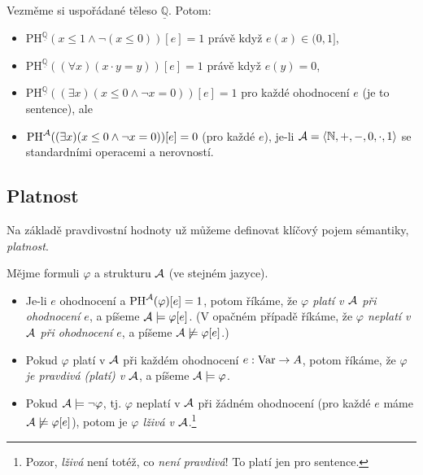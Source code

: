 \begin{example}
Vezměme si uspořádané těleso $\underline{\mathbb Q}$. Potom:
\begin{itemize}
    \item $\mathrm{PH}^{\underline{\mathbb Q}}(x\leq 1 \land \neg (x\leq 0))[e]=1$ právě když $e(x)\in (0,1]$,
    \item $\mathrm{PH}^{\underline{\mathbb Q}}((\forall x)(x\cdot y = y))[e]=1$ právě když $e(y)=0$,
    \item $\mathrm{PH}^{\underline{\mathbb Q}}((\exists x)(x \leq 0 \land \neg x=0))[e]=1$ pro každé ohodnocení $e$ (je to sentence), ale 
    \item $\mathrm{PH}^{\mathcal{A}}((\exists x)(x \leq 0 \land \neg x=0))[e]=0$ (pro každé $e$), je-li $\mathcal{A}=\langle \mathbb N,+,-,0,\cdot,1\rangle$ se standardními operacemi a nerovností.
\end{itemize}    
\end{example}


\subsection{Platnost}

Na základě pravdivostní hodnoty už můžeme definovat klíčový pojem sémantiky, \emph{platnost}.

\begin{definition}
Mějme formuli $\varphi$ a strukturu $\mathcal{A}$ (ve stejném jazyce). 
\begin{itemize}
    \item Je-li $e$ ohodnocení a $\mathrm{PH}^{\mathcal{A}}(\varphi)[e]=1$, potom říkáme, že \emph{$\varphi$ platí v $\mathcal{A}$ při ohodnocení $e$}, a píšeme $\mathcal{A}\models\varphi[e]$. (V opačném případě říkáme, že \emph{$\varphi$ neplatí v $\mathcal{A}$ při ohodnocení $e$}, a píšeme $\mathcal{A}\not\models\varphi[e]$.)
    \item Pokud $\varphi$ platí v $\mathcal{A}$ při každém ohodnocení $e:\operatorname{Var}\to A$, potom říkáme, že \emph{$\varphi$ je pravdivá (platí) v $\mathcal{A}$}, a píšeme $\mathcal{A}\models\varphi$.
    \item Pokud $\mathcal{A}\models\neg\varphi$, tj. $\varphi$ neplatí v $\mathcal{A}$ při žádném ohodnocení (pro každé $e$ máme $\mathcal{A}\not\models\varphi[e]$), potom je \emph{$\varphi$ lživá v $\mathcal{A}$}.\footnote{Pozor, \emph{lživá} není totéž, co \emph{není pravdivá}! To platí jen pro sentence.}
\end{itemize}    
\end{definition}

